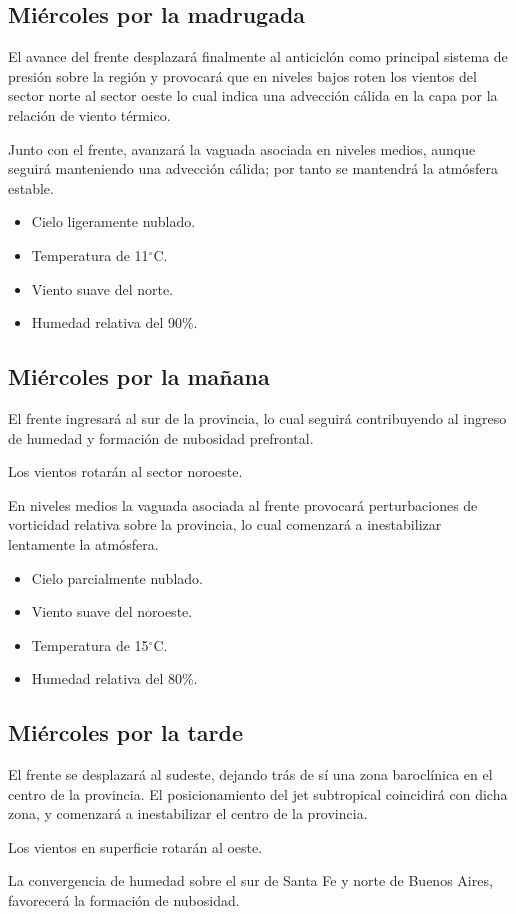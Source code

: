 \documentclass{article}
\begin{document}
\subsection{Miércoles por la madrugada}
El avance del frente desplazará finalmente al anticiclón como principal sistema de presión sobre la región y provocará que en niveles bajos roten los vientos del
sector norte al sector oeste lo cual indica una advección cálida en la capa por la relación de viento térmico.
\par Junto con el frente, avanzará la vaguada asociada en niveles medios, aunque seguirá manteniendo una advección cálida; por tanto se mantendrá la atmósfera
estable.

\begin{itemize}
    \item Cielo ligeramente nublado.
    \item Temperatura de 11$^\circ$C.
    \item Viento suave del norte.
    \item Humedad relativa del 90\%.
\end{itemize}

\subsection{Miércoles por la mañana}
El frente ingresará al sur de la provincia, lo cual seguirá contribuyendo al ingreso de humedad y formación de nubosidad prefrontal.
\par Los vientos rotarán al sector noroeste.
\par En niveles medios la vaguada asociada al frente provocará perturbaciones de vorticidad relativa sobre la provincia, lo cual comenzará
a inestabilizar lentamente la atmósfera.

\begin{itemize}
    \item Cielo parcialmente nublado.
    \item Viento suave del noroeste.
    \item Temperatura de 15$^\circ$C.
    \item Humedad relativa del 80\%.
\end{itemize}

\subsection{Miércoles por la tarde}
El frente se desplazará al sudeste, dejando trás de sí una zona baroclínica en el centro de la provincia.
El posicionamiento del jet subtropical coincidirá con dicha zona, y comenzará a inestabilizar el centro de la provincia.
\par Los vientos en superficie rotarán al oeste.
\par La convergencia de humedad sobre el sur de Santa Fe y norte de Buenos Aires, favorecerá la formación de nubosidad.
\end{document}
